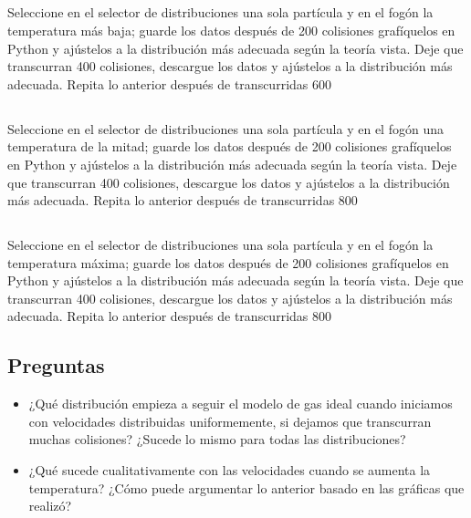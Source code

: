 \documentclass[11pt]{article}
\begin{document}
\subsection{}
Seleccione en el selector de distribuciones una sola partícula y en el fogón la temperatura más baja; guarde los datos después de 200 colisiones grafíquelos en Python y ajústelos a la distribución más adecuada según la teoría vista. Deje que transcurran 400 colisiones, descargue los datos y ajústelos a la distribución más adecuada. Repita lo anterior después de transcurridas 600

\subsection{}
Seleccione en el selector de distribuciones una sola partícula y en el fogón una temperatura de la mitad; guarde los datos después de 200 colisiones grafíquelos en Python y ajústelos a la distribución más adecuada según la teoría vista. Deje que transcurran 400 colisiones, descargue los datos y ajústelos a la distribución más adecuada. Repita lo anterior después de transcurridas 800

\subsection{}
Seleccione en el selector de distribuciones una sola partícula y en el fogón la temperatura máxima; guarde los datos después de 200 colisiones grafíquelos en Python y ajústelos a la distribución más adecuada según la teoría vista. Deje que transcurran 400 colisiones, descargue los datos y ajústelos a la distribución más adecuada. Repita lo anterior después de transcurridas 800

\subsection{Preguntas}

\begin{itemize}
    \item ¿Qué distribución empieza a seguir el modelo de gas ideal cuando iniciamos con velocidades distribuidas uniformemente, si dejamos que transcurran muchas colisiones? ¿Sucede lo mismo para todas las distribuciones? 
    \item ¿Qué sucede cualitativamente con las velocidades cuando se aumenta la temperatura? ¿Cómo puede argumentar lo anterior basado en las gráficas que realizó?
    
\end{itemize}
\end{document}
